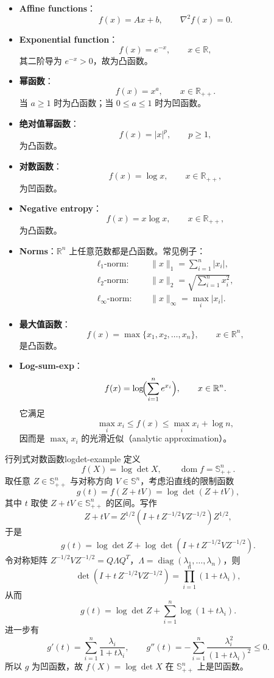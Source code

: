 \documentclass[11pt,a4paper]{article}
\begin{document}
\begin{itemize}
  \item \textbf{Affine functions}：
  \[
  f(x)=Ax+b,\qquad \nabla^2 f(x)=0.
  \]

  \item \textbf{Exponential function}：
  \[
  f(x)=e^{-x},\qquad x\in\mathbb{R},
  \]
  其二阶导为 $e^{-x}>0$，故为凸函数。

  \item \textbf{幂函数}：
  \[
  f(x)=x^a,\qquad x\in\mathbb{R}_{++}.
  \]
  当 $a\ge 1$ 时为凸函数；当 $0\le a\le 1$ 时为凹函数。

  \item \textbf{绝对值幂函数}：
  \[
  f(x)=|x|^p,\qquad p\ge 1,
  \]
  为凸函数。

  \item \textbf{对数函数}：
  \[
  f(x)=\log x,\qquad x\in\mathbb{R}_{++},
  \]
  为凹函数。

  \item \textbf{Negative entropy}：
  \[
  f(x)=x\log x,\qquad x\in\mathbb{R}_{++},
  \]
  为凸函数。

  \item \textbf{Norms}：$\mathbb{R}^n$ 上任意范数都是凸函数。常见例子：
  \begin{align*}
    \ell_1\text{-norm: } &\quad \|x\|_1=\sum_{i=1}^n |x_i|, \\
    \ell_2\text{-norm: } &\quad \|x\|_2=\sqrt{\sum_{i=1}^n x_i^2}, \\
    \ell_\infty\text{-norm: } &\quad \|x\|_\infty=\max_i |x_i|.
  \end{align*}

  \item \textbf{最大值函数}：
  \[
  f(x)=\max\{x_1,x_2,\dots,x_n\},\qquad x\in\mathbb{R}^n,
  \]
  是凸函数。

  \item \textbf{Log-sum-exp}：
  \[
  f(x)=\log\!\Bigl(\sum_{i=1}^n e^{x_i}\Bigr),\qquad x\in\mathbb{R}^n.
  \]
  它满足
  \[
  \max_i x_i \le f(x)\le \max_i x_i+\log n,
  \]
  因而是 $\max_i x_i$ 的光滑近似（analytic approximation）。
\end{itemize}

\begin{example}{行列式对数函数}{logdet-example}
定义
\[
f(X)=\log\det X,\qquad \operatorname{dom}f=\mathbb{S}_{++}^n.
\]
取任意 $Z\in\mathbb{S}_{++}^n$ 与对称方向 $V\in\mathbb{S}^n$，考虑沿直线的限制函数
\[
g(t)=f(Z+tV)=\log\det(Z+tV),
\]
其中 $t$ 取使 $Z+tV\in\mathbb{S}_{++}^n$ 的区间。写作
\[
Z+tV
=
Z^{1/2}\!\left(I+t\,Z^{-1/2}VZ^{-1/2}\right)Z^{1/2},
\]
于是
\[
g(t)=\log\det Z+\log\det\!\left(I+t\,Z^{-1/2}VZ^{-1/2}\right).
\]
令对称矩阵 $Z^{-1/2}VZ^{-1/2}=Q\Lambda Q^T$，$\Lambda=\operatorname{diag}(\lambda_1,\dots,\lambda_n)$，则
\[
\det\!\left(I+t\,Z^{-1/2}VZ^{-1/2}\right)=\prod_{i=1}^n(1+t\lambda_i),
\]
从而
\[
g(t)=\log\det Z+\sum_{i=1}^n\log(1+t\lambda_i).
\]
进一步有
\[
g'(t)=\sum_{i=1}^n\frac{\lambda_i}{1+t\lambda_i},\qquad
g''(t)=-\sum_{i=1}^n\frac{\lambda_i^2}{(1+t\lambda_i)^2}\le 0.
\]
所以 $g$ 为凹函数，故 $f(X)=\log\det X$ 在 $\mathbb{S}_{++}^n$ 上是凹函数。
\end{example}
\end{document}
